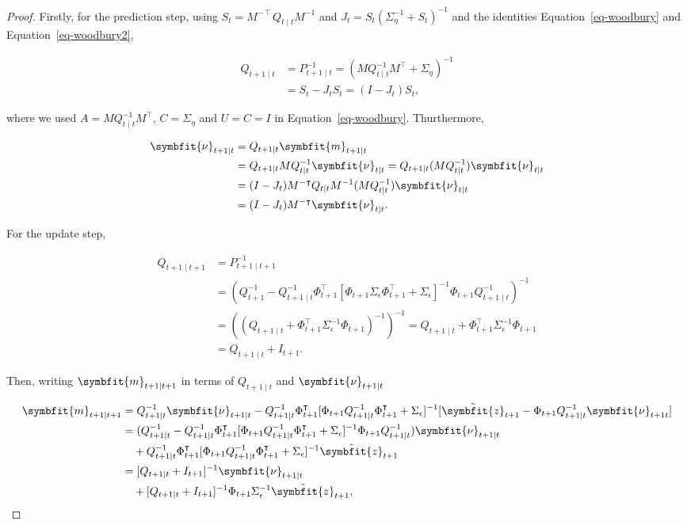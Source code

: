 \documentclass[
]{report}
\newcommand{\bv}[1]{\symbfit{#1}}
\theoremstyle{plain}
\theoremstyle{plain}
\theoremstyle{plain}
\theoremstyle{remark}
\begin{document}
\begin{proof}
Firstly, for the prediction step, using
\(S_t = M^{-\intercal}Q_{t\mid t}M^{-1}\) and
\(J_t = S_t(\Sigma_\eta^{-1} + S_t)^{-1}\) and the identities
Equation~\ref{eq-woodbury} and Equation~\ref{eq-woodbury2},

\[\begin{split}
  Q_{t+1\mid t} &= P_{t+1\mid t}^{-1} = (MQ_{t\mid t}^{-1}M^\intercal + \Sigma_\eta)^{-1}\\
  &= S_t - J_t S_t = (I-J_t)S_t,
\end{split}
\]

where we used \(A=MQ_{t\mid t}^{-1}M^\intercal\), \(C=\Sigma_\eta\) and
\(U=C=I\) in Equation~\ref{eq-woodbury}. Thurthermore,

\[\begin{split}
  \bv \nu_{t+1\mid t} &= Q_{t+1\mid t} \bv m_{t+1\mid t}\\
  &= Q_{t+1\mid t} M Q_{t\mid t}^{-1} \bv \nu_{t\mid t} = Q_{t+1\mid t} (M Q_{t\mid t}^{-1}) \bv \nu_{t\mid t}\\
  &= (I-J_t)M^{-\intercal}Q_{t\mid t}M^{-1} (M Q_{t\mid t}^{-1}) \bv \nu_{t\mid t}\\
  &= (I-J_t)M^{-\intercal} \bv \nu_{t\mid t}.
\end{split}
\]

For the update step,

\[\begin{split}
  Q_{t+1\mid t+1} &= P_{t+1\mid t+1}^{-1}\\
  &= (Q_{t+1}^{-1} - Q_{t+1\mid t}^{-1}\Phi_{t+1}^\intercal[\Phi_{t+1}\Sigma_\epsilon\Phi_{t+1}^\intercal + \Sigma_\epsilon]^{-1}\Phi_{t+1}Q_{t+1\mid t}^{-1})^{-1}\\
  &= ((Q_{t+1\mid t} + \Phi_{t+1}^\intercal\Sigma_\epsilon^{-1}\Phi_{t+1})^{-1})^{-1} = Q_{t+1\mid t} + \Phi_{t+1}^\intercal\Sigma_\epsilon^{-1}\Phi_{t+1}\\
  &= Q_{t+1\mid t} + I_{t+1}.
\end{split}
\]

Then, writing \(\bv m_{t+1\mid t+1}\) in terms of \(Q_{t+1\mid t}\) and
\(\bv \nu_{t+1\mid t}\)

\[\begin{split}
  \bv m_{t+1\mid t+1} &= Q_{t+1\mid t}^{-1} \bv \nu_{t+1\mid t} - Q_{t+1\mid t}^{-1}\Phi_{t+1}^\intercal[\Phi_{t+1}Q_{t+1\mid t}^{-1}\Phi_{t+1}^\intercal +\Sigma_\epsilon]^{-1} [\tilde{\bv z}_{t+1} - \Phi_{t+1}Q_{t+1\mid t}^{-1}\bv \nu_{t+1\mit t}]\\
  &= (Q_{t+1\mid t}^{-1} - Q_{t+1\mid t}^{-1}\Phi_{t+1}^\intercal[\Phi_{t+1}Q_{t+1\mid t}^{-1}\Phi_{t+1}^\intercal +\Sigma_\epsilon]^{-1}\Phi_{t+1}Q_{t+1\mid t}^{-1})\bv \nu_{t+1\mid t} \\
  &\quad + Q_{t+1\mid t}^{-1}\Phi_{t+1}^\intercal[\Phi_{t+1}Q_{t+1\mid t}^{-1}\Phi_{t+1}^\intercal +\Sigma_\epsilon]^{-1}\tilde{\bv z}_{t+1}\\
  &= [Q_{t+1\mid t} + I_{t+1}]^{-1}\bv \nu_{t+1\mid t}\\
  &\quad + [Q_{t+1\mid t} + I_{t+1}]^{-1}\Phi_{t+1}\Sigma_\epsilon^{-1}\tilde{\bv z}_{t+1},
\end{split} 
\]


\end{proof}
\end{document}
